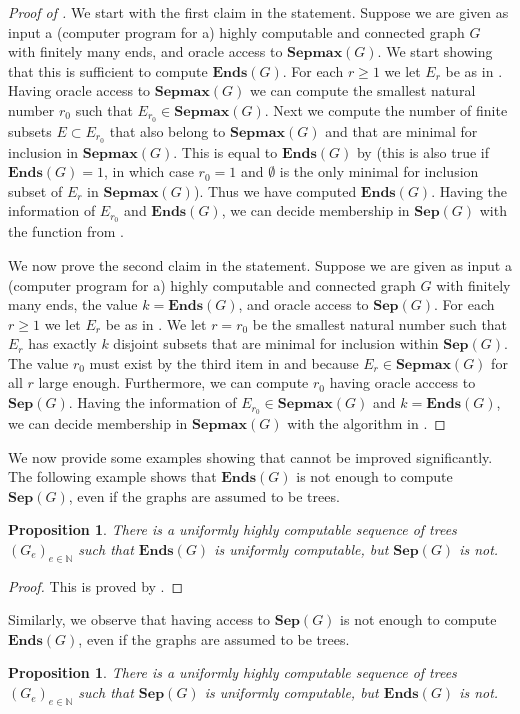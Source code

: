 \documentclass[10pt,A4]{amsart}
\newtheorem{prop}[thm]{Proposition}
\theoremstyle{definition}
\theoremstyle{definition}
\newcommand{\N}{\mathbb{N}}
\newcommand{\sep}[1]{\mathbf{Sep}({#1})}
\newcommand{\Ends}[1]{\mathbf{Ends}({#1})}
\newcommand{\sepmax}[1]{\mathbf{Sepmax}({#1})}
\begin{document}
\begin{proof}[Proof of ]
We start with the first claim in the statement. Suppose we are given as input a (computer program for a) highly computable and connected graph $G$ with finitely many ends, and oracle access to $\sepmax{G}$. We start showing that this is sufficient to compute $\Ends{G}$. For each $r\geq 1$ we let $E_r$ be as in . Having oracle access to $\sepmax{G}$ we can compute the smallest natural number $r_0$ such that $E_{r_0}\in\sepmax{G}$. Next we compute the number of finite subsets $E\subset E_{r_0}$ that also belong to $\sepmax{G}$ and that are minimal for inclusion in $\sepmax{G}$. This is equal to $\Ends{G}$ by  (this is also true if $\Ends{G}=1$, in which case $r_0=1$ and $\emptyset$ is the only minimal for inclusion subset of $E_r$ in $\sepmax{G}$). Thus we have computed $\Ends{G}$. Having the information of $E_{r_0}$ and $\Ends{G}$, we can decide membership in $\sep{G}$ with the function from .  


We now prove the second claim in the statement. Suppose we are given as input a (computer program for a) highly computable and connected graph $G$ with finitely many ends, the value $k=\Ends{G}$, and oracle access to $\sep{G}$.  For each $r\geq 1$ we let $E_r$ be as in . We let $r=r_0$ be the smallest natural number such that $E_r$ has exactly $k$ disjoint subsets that are minimal for inclusion within $\sep{G}$. The value $r_0$ must exist by the third item in  and because $E_r\in\sepmax{G}$ for all $r$ large enough. Furthermore, we can compute $r_0$ having oracle acccess to $\sep{G}$. Having the information of $E_{r_0}\in\sepmax{G}$ and $k=\Ends{G}$, we can decide membership in $\sepmax{G}$ with the algorithm in .  
\end{proof}



We now provide some examples showing that   cannot be improved significantly. The following example shows that  $\Ends{G}$ is not enough to compute $\sep{G}$, even if the graphs are assumed to be trees. 
\begin{prop}
    There is a uniformly highly computable sequence of trees $(G_e)_{e\in\N}$ such that $\Ends{G}$ is uniformly computable, but $\sep{G}$ is not. 
 \end{prop}
\begin{proof}
    This is proved by .
\end{proof}
Similarly, we observe that having access to $\sep{G}$ is not enough to compute $\Ends{G}$, even if the graphs are assumed to be trees. 
\begin{prop}
    There is a uniformly highly computable sequence of trees $(G_e)_{e\in\N}$ such that $\sep{G}$ is uniformly computable, but $\Ends{G}$ is not.
\end{prop}
\end{document}
